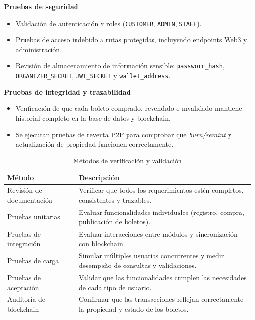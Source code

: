 \documentclass[12pt,letterpaper]{article}
\begin{document}
\textbf{Pruebas de seguridad}  
\begin{itemize}
    \item Validación de autenticación y roles (\texttt{CUSTOMER}, \texttt{ADMIN},
    \texttt{STAFF}).
    \item Pruebas de acceso indebido a rutas protegidas, incluyendo endpoints Web3 y
    administración.
    \item Revisión de almacenamiento de información sensible: \texttt{password\_hash},
    \texttt{ORGANIZER\_SECRET}, \texttt{JWT\_SECRET} y \texttt{wallet\_address}.
\end{itemize}

\textbf{Pruebas de integridad y trazabilidad}  
\begin{itemize}
    \item Verificación de que cada boleto comprado, revendido o invalidado mantiene
    historial completo en la base de datos y blockchain.
    \item Se ejecutan pruebas de reventa P2P para comprobar que \textit{burn/remint}
    y actualización de propiedad funcionen correctamente.
\end{itemize}

\begin{table}[H]
\centering
\scriptsize
\renewcommand{\arraystretch}{1.15}
\setlength{\tabcolsep}{4pt}

\begin{tabularx}{\textwidth}{|p{4cm}|X|}
\hline
\textbf{Método} & \textbf{Descripción} \\ \hline

Revisión de documentación & Verificar que todos los requerimientos estén completos, consistentes y trazables. \\ \hline
Pruebas unitarias & Evaluar funcionalidades individuales (registro, compra, publicación de boletos). \\ \hline
Pruebas de integración & Evaluar interacciones entre módulos y sincronización con blockchain. \\ \hline
Pruebas de carga & Simular múltiples usuarios concurrentes y medir desempeño de consultas y validaciones. \\ \hline
Pruebas de aceptación & Validar que las funcionalidades cumplen las necesidades de cada tipo de usuario. \\ \hline
Auditoría de blockchain & Confirmar que las transacciones reflejan correctamente la propiedad y estado de los boletos. \\ \hline

\end{tabularx}

\caption{Métodos de verificación y validación}
\label{tab:metodos_verificacion}
\normalsize
\end{table}
\end{document}

